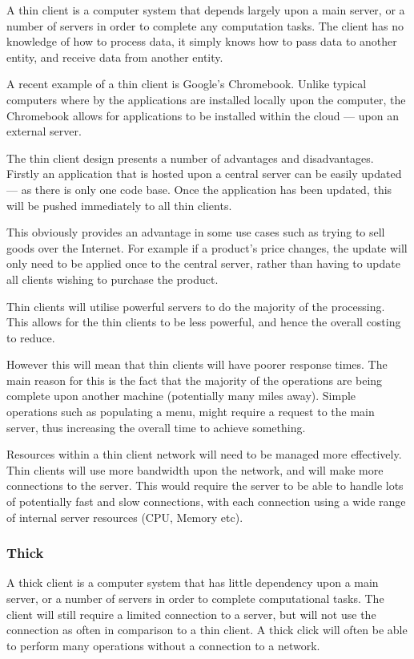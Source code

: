 A thin client is a computer system that depends largely upon a main server, or 
a number of servers in order to complete any computation tasks. The client has 
no knowledge of how to process data, it simply knows how to pass data to 
another entity, and receive data from another entity.

A recent example of a thin client is Google's Chromebook. Unlike typical 
computers where by the applications are installed locally upon the computer, 
the Chromebook allows for applications to be installed within the cloud --- 
upon an external server.

The thin client design presents a number of advantages and disadvantages. 
Firstly an application that is hosted upon a central server can be easily 
updated --- as there is only one code base. Once the application has been 
updated, this will be pushed immediately to all thin clients.

This obviously provides an advantage in some use cases such as trying to sell 
goods over the Internet. For example if a product's price changes, the update 
will only need to be applied once to the central server, rather than having to 
update all clients wishing to purchase the product.

Thin clients will utilise powerful servers to do the majority of the 
processing. This allows for the thin clients to be less powerful, and hence the
overall costing to reduce.

However this will mean that thin clients will have poorer response times. The 
main reason for this is the fact that the majority of the operations are being 
complete upon another machine (potentially many miles away). Simple operations 
such as populating a menu, might require a request to the main server, thus 
increasing the overall time to achieve something.

Resources within a thin client network will need to be managed more 
effectively. Thin clients will use more bandwidth upon the network, and will 
make more connections to the server. This would require the server to be able 
to handle lots of potentially fast and slow connections, with each connection 
using a wide range of internal server resources (CPU, Memory etc). 


\subsubsection{Thick}

A thick client is a computer system that has little dependency upon a main 
server, or a number of servers in order to complete computational tasks. The 
client will still require a limited connection to a server, but will not use 
the connection as often in comparison to a thin client. A thick click will 
often be able to perform many operations without a connection to a network.

